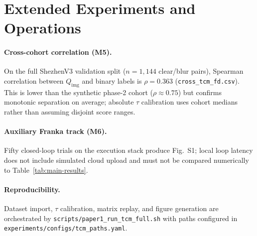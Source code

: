 \section{Extended Experiments and Operations}
\label{sec:app-experiments}

\paragraph{Cross-cohort correlation (M5).}
On the full ShezhenV3 validation split ($n{=}1{,}144$ clear/blur pairs), Spearman correlation between $Q_{\mathrm{img}}$ and binary labels is $\rho{=}0.363$ (\texttt{cross\_tcm\_fd.csv}).
This is lower than the synthetic phase-2 cohort ($\rho{\approx}0.75$) but confirms monotonic separation on average; absolute $\tau$ calibration uses cohort medians rather than assuming disjoint score ranges.

\paragraph{Auxiliary Franka track (M6).}
Fifty closed-loop trials on the execution stack produce Fig.~S1; local loop latency does not include simulated cloud upload and must not be compared numerically to Table~\ref{tab:main-results}.

\paragraph{Reproducibility.}
Dataset import, $\tau$ calibration, matrix replay, and figure generation are orchestrated by \texttt{scripts/paper1\_run\_tcm\_full.sh} with paths configured in \texttt{experiments/configs/tcm\_paths.yaml}.









